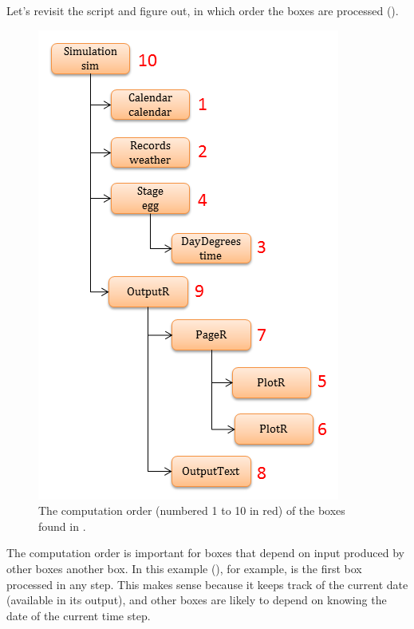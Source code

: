 Let's revisit the  script and figure out, in which order the boxes are processed ().
\begin{figure}
\centering
\includegraphics[scale=0.8]{graphics/box-tree}
\caption{The computation order (numbered 1 to 10 in red) of the boxes found in .}
\label{fig:box-tree}
\end{figure}

The computation order is important for boxes that depend on input produced by other boxes another box. In this example (), for example,  is the first box processed in any step. This makes sense because it keeps track of the current date (available in its  output), and other boxes are likely to depend on knowing the date of the current time step.
